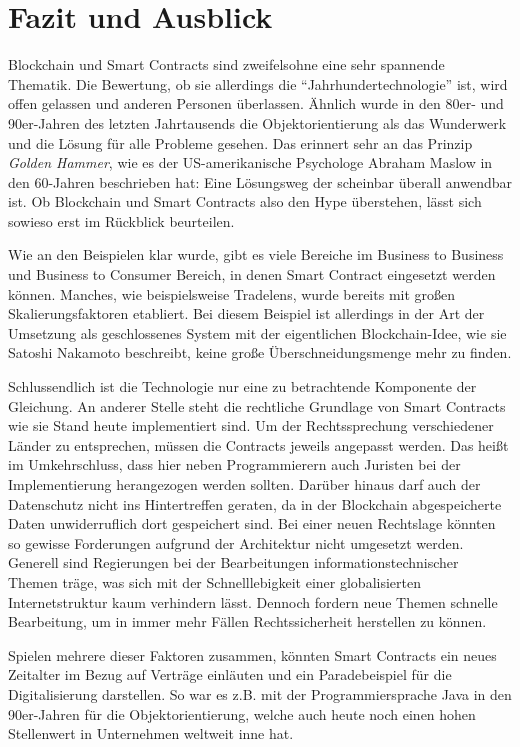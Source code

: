 \chapter{Fazit und Ausblick}
\label{chap:FazitUndAusblick}
Blockchain und Smart Contracts sind zweifelsohne eine sehr spannende Thematik. Die Bewertung, ob sie allerdings die \enquote{Jahrhundertechnologie} ist, wird offen gelassen und anderen Personen überlassen. Ähnlich wurde in den 80er- und 90er-Jahren des letzten Jahrtausends die Objektorientierung als das Wunderwerk und die Lösung für alle Probleme gesehen. Das erinnert sehr an das Prinzip \emph{Golden Hammer}, wie es der US-amerikanische Psychologe Abraham Maslow in den 60-Jahren beschrieben hat: Eine Lösungsweg der scheinbar überall anwendbar ist. Ob Blockchain und Smart Contracts also den Hype überstehen, lässt sich sowieso erst im Rückblick beurteilen.

Wie an den Beispielen klar wurde, gibt es viele Bereiche im Business to Business und Business to Consumer Bereich, in denen Smart Contract eingesetzt werden können. Manches, wie beispielsweise Tradelens, wurde bereits mit großen Skalierungsfaktoren etabliert. Bei diesem Beispiel ist allerdings in der Art der Umsetzung als geschlossenes System mit der eigentlichen Blockchain-Idee, wie sie Satoshi Nakamoto beschreibt, keine große Überschneidungsmenge mehr zu finden.

Schlussendlich ist die Technologie nur eine zu betrachtende Komponente der Gleichung. An anderer Stelle steht die rechtliche Grundlage von Smart Contracts wie sie Stand heute implementiert sind. Um der Rechtssprechung verschiedener Länder zu entsprechen, müssen die Contracts jeweils angepasst werden. Das heißt im Umkehrschluss, dass hier neben Programmierern auch Juristen bei der Implementierung herangezogen werden sollten. Darüber hinaus darf auch der Datenschutz nicht ins Hintertreffen geraten, da in der Blockchain abgespeicherte Daten unwiderruflich dort gespeichert sind. Bei einer neuen Rechtslage könnten so gewisse Forderungen aufgrund der Architektur nicht umgesetzt werden. Generell sind Regierungen bei der Bearbeitungen informationstechnischer Themen träge, was sich mit der Schnelllebigkeit einer globalisierten Internetstruktur kaum verhindern lässt. Dennoch fordern neue Themen schnelle Bearbeitung, um in immer mehr Fällen Rechtssicherheit herstellen zu können.

Spielen mehrere dieser Faktoren zusammen, könnten Smart Contracts ein neues Zeitalter im Bezug auf Verträge einläuten und ein Paradebeispiel für die Digitalisierung darstellen. So war es z.B. mit der Programmiersprache Java in den 90er-Jahren für die Objektorientierung, welche auch heute noch einen hohen Stellenwert in Unternehmen weltweit inne hat.